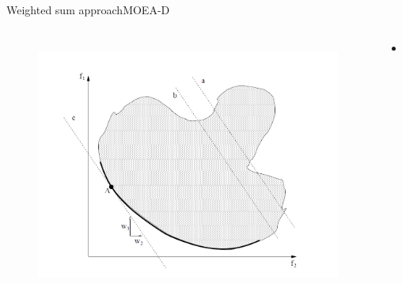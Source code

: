 \begin{frame}{Weighted sum approach}{MOEA-D}
	\begin{columns}
			\begin{figure}
				\centering
				\includegraphics[width=\linewidth]{figure/weighted_sum}
				\label{fig:weighted_sum}
			\end{figure}
		\begin{minipage}{\textwidth}
			\begin{itemize}
				\item 
			\end{itemize}
		\end{minipage}
	\end{columns}
\end{frame}

